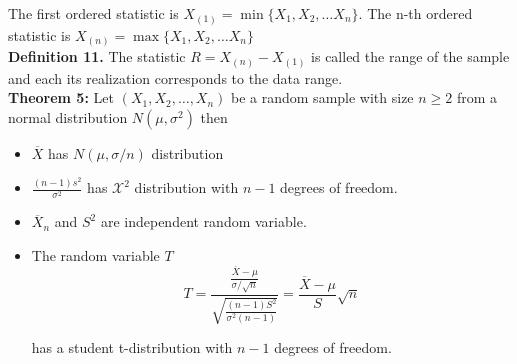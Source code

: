 \documentclass[a4paper, 12pt]{article}
\begin{document}
The first ordered statistic is $X_{(1)} = \min\{ X_1, X_2, \dots X_n \}$. The n-th ordered statistic is $X_{(n)} = \max\{ X_1, X_2, \dots X_n \}$\\

\textbf{Definition 11.} The statistic $R=X_{(n)}-X_{(1)}$ is called the range of the sample and each its realization corresponds to the data range.\\

\textbf{Theorem 5:} Let $(X_1, X_2, \dots, X_n)$ be a random sample with size $n\geq2$ from a normal distribution $N(\mu, \sigma^2)$ then

\begin{itemize}
  \item $\overline{X}$ has $N(\mu, \sigma/n)$ distribution
  \item $\frac{(n-1)s^2}{\sigma^2}$ has $\mathcal{X}^2$ distribution with $n-1$ degrees of freedom.
  \item $\overline{X}_n$ and $S^2$ are independent random variable.
  \item The random variable $T$
  \[ T=\frac{\frac{\overline{X}-\mu}{\sigma/\sqrt{n}}}{\sqrt{\frac{(n-1)S^2}{\sigma^2(n-1)}}} = \frac{\overline{X}-\mu}{S}\sqrt{n} \]

  has a student t-distribution with $n-1$ degrees of freedom.
\end{itemize}
\end{document}
